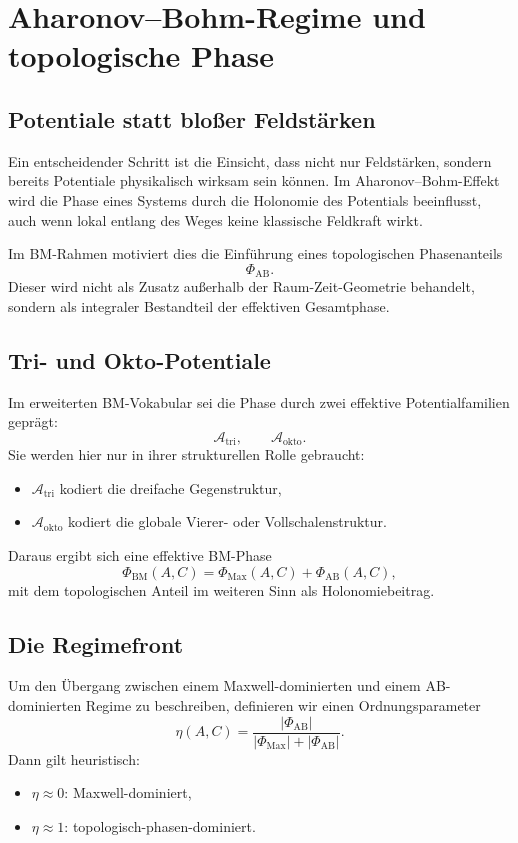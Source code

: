 \documentclass[11pt,a4paper]{article}
\theoremstyle{definition}
\theoremstyle{plain}
\begin{document}
	\section{Aharonov--Bohm-Regime und topologische Phase}
	
	\subsection{Potentiale statt bloßer Feldstärken}
	
	Ein entscheidender Schritt ist die Einsicht, dass nicht nur Feldstärken, sondern bereits Potentiale physikalisch wirksam sein können. Im Aharonov--Bohm-Effekt wird die Phase eines Systems durch die Holonomie des Potentials beeinflusst, auch wenn lokal entlang des Weges keine klassische Feldkraft wirkt.
	
	Im BM-Rahmen motiviert dies die Einführung eines topologischen Phasenanteils
	\[
	\Phi_{\mathrm{AB}}.
	\]
	Dieser wird nicht als Zusatz außerhalb der Raum-Zeit-Geometrie behandelt, sondern als integraler Bestandteil der effektiven Gesamtphase.
	
	\subsection{Tri- und Okto-Potentiale}
	
	Im erweiterten BM-Vokabular sei die Phase durch zwei effektive Potentialfamilien geprägt:
	\[
	\mathcal A_{\mathrm{tri}},
	\qquad
	\mathcal A_{\mathrm{okto}}.
	\]
	Sie werden hier nur in ihrer strukturellen Rolle gebraucht:
	\begin{itemize}[leftmargin=2em]
		\item $\mathcal A_{\mathrm{tri}}$ kodiert die dreifache Gegenstruktur,
		\item $\mathcal A_{\mathrm{okto}}$ kodiert die globale Vierer- oder Vollschalenstruktur.
	\end{itemize}
	
	Daraus ergibt sich eine effektive BM-Phase
	\[
	\Phi_{\mathrm{BM}}(A,C)
	=
	\Phi_{\mathrm{Max}}(A,C)+\Phi_{\mathrm{AB}}(A,C),
	\]
	mit dem topologischen Anteil im weiteren Sinn als Holonomiebeitrag.
	
	\subsection{Die Regimefront}
	
	Um den Übergang zwischen einem Maxwell-dominierten und einem AB-dominierten Regime zu beschreiben, definieren wir einen Ordnungsparameter
	\[
	\eta(A,C)=\frac{|\Phi_{\mathrm{AB}}|}{|\Phi_{\mathrm{Max}}|+|\Phi_{\mathrm{AB}}|}.
	\]
	Dann gilt heuristisch:
	\begin{itemize}[leftmargin=2em]
		\item $\eta\approx 0$: Maxwell-dominiert,
		\item $\eta\approx 1$: topologisch-phasen-dominiert.
	\end{itemize}
	
\end{document}
